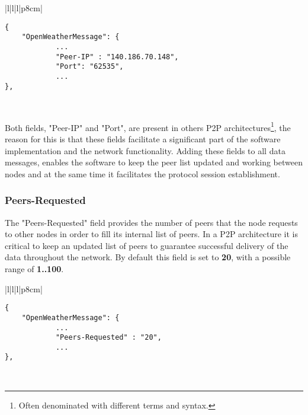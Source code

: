 \begin{table}[H]
\centering
\begin{tabular}{|l|l|l|p{8cm}|}
\hline
\begin{minipage}[t]{\linewidth}
	\begin{verbatim}
{
    "OpenWeatherMessage": {
            ...
            "Peer-IP" : "140.186.70.148",
            "Port": "62535",
            ...
},
      \end{verbatim}
\end{minipage} \\
\hline
\end{tabular}
\caption{Peer-IP \& Port fields in a data message of OpenWeather protocol.}
\end{table}

Both fields, "Peer-IP" and "Port", are present in others \gls{P2P} architectures\footnote{Often denominated with different terms and syntax.}, the reason for this is that these fields facilitate a significant part of the software implementation and the network functionality. Adding these fields to all data messages, enables the software to keep the peer list updated and working between nodes and at the same time it facilitates the protocol session establishment.


\subsubsection{Peers-Requested}

The "Peers-Requested" field provides the number of peers that the node requests to other nodes in order to fill its internal list of peers. In a \gls{P2P} architecture it is critical to keep an updated list of peers to guarantee successful delivery of the data throughout the network. By default this field is set to \textbf{20}, with a possible range of \textbf{1..100}.

\begin{table}[H]
\centering
\begin{tabular}{|l|l|l|p{8cm}|}
\hline
\begin{minipage}[t]{\linewidth}
	\begin{verbatim}
{
    "OpenWeatherMessage": {
            ...
            "Peers-Requested" : "20",
            ...
},
      \end{verbatim}
\end{minipage} \\
\hline
\end{tabular}
\caption{Peers-Requested field in a data messages of OpenWeather protocol.}
\end{table}



